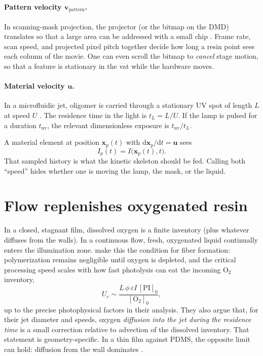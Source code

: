\paragraph{Pattern velocity $\mathbf{v}_{\mathrm{pattern}}$.}
In scanning-mask projection, the projector (or the bitmap on the DMD) translates so that a large area can be addressed with a small chip \citep{Meenakshisundaram2020}.
Frame rate, scan speed, and projected pixel pitch together decide how long a resin point sees each column of the movie.
One can even scroll the bitmap to \emph{cancel} stage motion, so that a feature is stationary in the vat while the hardware moves.

\paragraph{Material velocity $\mathbf{u}$.}
In a microfluidic jet, oligomer is carried through a stationary UV spot of length $L$ at speed $U$ \citep{Slutzky2019}.
The residence time in the light is $t_L = L/U$.
If the lamp is pulsed for a duration $t_{\mathrm{uv}}$, the relevant dimensionless exposure is $t_{\mathrm{uv}}/t_L$.

A material element at position $\mathbf{x}_p(t)$ with $\mathrm{d}\mathbf{x}_p/\mathrm{d}t=\mathbf{u}$ sees
\begin{equation}
  I_p(t) = I\bigl(\mathbf{x}_p(t),t\bigr).
\end{equation}
That sampled history is what the kinetic skeleton should be fed.
Calling both ``speed'' hides whether one is moving the lamp, the mask, or the liquid.

\section{Flow replenishes oxygenated resin}

In a closed, stagnant film, dissolved oxygen is a finite inventory (plus whatever diffuses from the walls).
In a continuous flow, fresh, oxygenated liquid continually enters the illumination zone.
\citet{Slutzky2019} make this the condition for fiber formation: polymerization remains negligible until oxygen is depleted, and the critical processing speed scales with how fast photolysis can eat the incoming $\mathrm{O}_2$ inventory,
\begin{equation}
  U_c \sim \frac{L\,\phi\,\varepsilon I\,[\mathrm{PI}]_0}{[\mathrm{O}_2]_0},
  \label{eq:Uc}
\end{equation}
up to the precise photophysical factors in their analysis.
They also argue that, for their jet diameter and speeds, oxygen \emph{diffusion into the jet during the residence time} is a small correction relative to advection of the dissolved inventory.
That statement is geometry-specific.
In a thin film against PDMS, the opposite limit can hold: diffusion from the wall dominates \citep{Dendukuri2008}.

